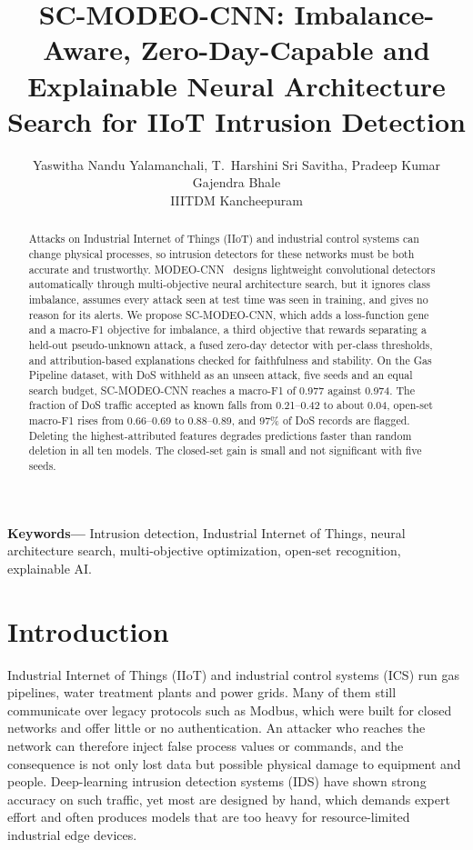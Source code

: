 \documentclass[10pt,twocolumn,letterpaper]{article}
\title{\textbf{SC-MODEO-CNN: Imbalance-Aware, Zero-Day-Capable and Explainable Neural Architecture Search for IIoT Intrusion Detection}}
\author{Yaswitha Nandu Yalamanchali, T.\ Harshini Sri Savitha, Pradeep Kumar Gajendra Bhale\\ {\small IIITDM Kancheepuram}}
\date{}
\begin{document}
\maketitle
\begin{abstract}
Attacks on Industrial Internet of Things (IIoT) and industrial control
systems can change physical processes, so intrusion detectors for these
networks must be both accurate and trustworthy. MODEO-CNN~\cite{lu2025modeo}
designs lightweight convolutional detectors automatically through
multi-objective neural architecture search, but it ignores class
imbalance, assumes every attack seen at test time was seen in training,
and gives no reason for its alerts. We propose SC-MODEO-CNN, which adds a
loss-function gene and a macro-F1 objective for imbalance, a third
objective that rewards separating a held-out pseudo-unknown attack, a
fused zero-day detector with per-class thresholds, and attribution-based
explanations checked for faithfulness and stability. On the Gas Pipeline
dataset, with DoS withheld as an unseen attack, five seeds and an equal
search budget, SC-MODEO-CNN reaches a macro-F1 of 0.977 against 0.974.
The fraction of DoS traffic accepted as known falls from 0.21--0.42 to
about 0.04, open-set macro-F1 rises from 0.66--0.69 to 0.88--0.89, and
97\% of DoS records are flagged. Deleting the highest-attributed features
degrades predictions faster than random deletion in all ten models. The
closed-set gain is small and not significant with five seeds.
\end{abstract}
\noindent\textbf{Keywords---} Intrusion detection, Industrial Internet of Things, neural architecture search, multi-objective optimization, open-set recognition, explainable AI.


\section{Introduction}

Industrial Internet of Things (IIoT) and industrial control systems (ICS)
run gas pipelines, water treatment plants and power grids. Many of them
still communicate over legacy protocols such as Modbus, which were built
for closed networks and offer little or no authentication. An attacker
who reaches the network can therefore inject false process values or
commands, and the consequence is not only lost data but possible physical
damage to equipment and people. Deep-learning intrusion detection systems
(IDS) have shown strong accuracy on such traffic, yet most are designed by
hand, which demands expert effort and often produces models that are too
heavy for resource-limited industrial edge devices.
\end{document}
